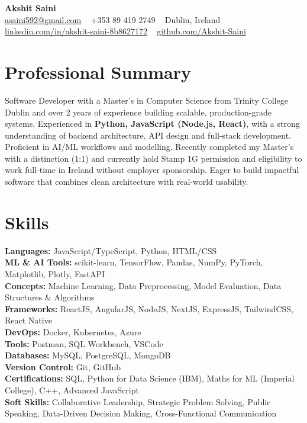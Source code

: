 \documentclass[a4paper,9pt]{article}
\begin{document}
\begin{center}
    {\LARGE \textbf{Akshit Saini}} \\[2pt]
    \href{mailto:asaini592@gmail.com}{asaini592@gmail.com} \textbar~ +353 89 419 2749 \textbar~ Dublin, Ireland \\ 
    \href{https://www.linkedin.com/in/akshit-saini-8b8627172/}{linkedin.com/in/akshit-saini-8b8627172} \textbar~ \href{https://github.com/Akshit-Saini}{github.com/Akshit-Saini}
\end{center}

\section*{Professional Summary}
Software Developer with a Master’s in Computer Science from Trinity College Dublin and over 2 years of experience building scalable, production-grade systems. Experienced in \textbf{Python, JavaScript (Node.js, React)}, with a strong understanding of backend architecture, API design and full-stack development. Proficient in AI/ML workflows and modelling. Recently completed my Master's with a distinction (1:1) and currently hold Stamp 1G permission and eligibility to work full-time in Ireland without employer sponsorship. Eager to build impactful software that combines clean architecture with real-world usability.

\section*{Skills}
\textbf{Languages:} JavaScript/TypeScript, Python,  HTML/CSS \\
\textbf{ML \& AI Tools:} scikit-learn, TensorFlow, Pandas, NumPy, PyTorch, Matplotlib, Plotly, FastAPI \\
\textbf{Concepts:} Machine Learning, Data Preprocessing, Model Evaluation, Data Structures \& Algorithms\\
\textbf{Frameworks:} ReactJS, AngularJS, NodeJS, NextJS, ExpressJS, TailwindCSS, React Native \\
\textbf{DevOps:} Docker, Kubernetes, Azure \\
\textbf{Tools:} Postman, SQL Workbench, VSCode \\
\textbf{Databases:} MySQL, PostgreSQL, MongoDB \\
\textbf{Version Control:} Git, GitHub \\
\textbf{Certifications:} SQL, Python for Data Science (IBM), Maths for ML (Imperial College), C++, Advanced JavaScript \\
\textbf{Soft Skills:} Collaborative Leadership, Strategic Problem Solving, Public Speaking, Data-Driven Decision Making, Cross-Functional Communication \\
\end{document}
